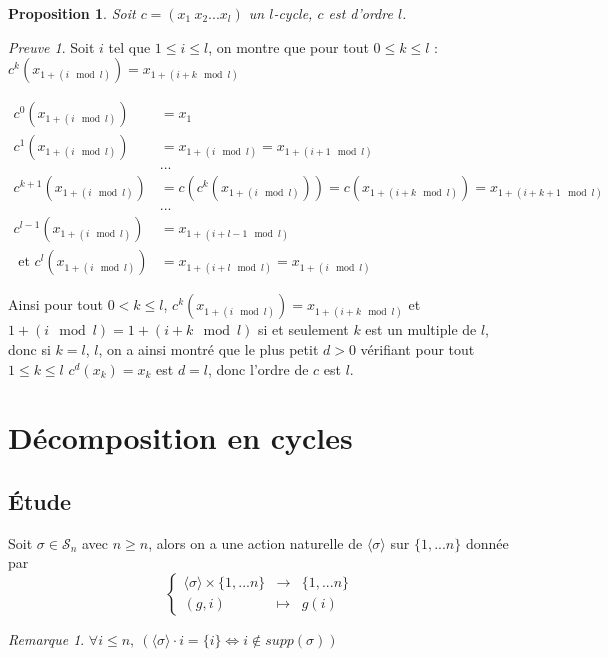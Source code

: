 \documentclass[]{article}
\newtheorem{myproposition}{Proposition}
\theoremstyle{remark}
\newtheorem{myrem}{Remarque}
\newtheorem{myproof}{Preuve}
\theoremstyle{definition}
\newcommand{\anonfunc}[4]{
\left\{ \begin{array}{lcl}
	#1 & \longrightarrow & #2 \\
	#3 & \longmapsto & #4
\end{array}
\right.
}
\begin{document}
\begin{myproposition}
	Soit $c = (x_1 ~ x_2 ... x_l)$ un $l$-cycle, $c$ est d'ordre $l$.
\end{myproposition}

\begin{myproof}
	Soit $i$ tel que $1 \leqslant i \leqslant l$, on montre que pour tout $0 \leqslant k \leqslant l$ : $c^{k}(x_{1 + (i \mod l)}) = x_{1 + (i + k \mod l)}$
	
	$$
	\begin{aligned}
		c^0(x_{1 + (i \mod l)}) &= x_1 \\
		c^1(x_{1 + (i \mod l)}) &= x_{1 + (i \mod l)} = x_{1 + (i+1 \mod l)}\\
		&...\\
		c^{k+1}(x_{1 + (i \mod l)}) &= c\left(c^k(x_{1 + (i \mod l)})\right) =c(x_{1+(i+k \mod l)}) = x_{1+(i+k+1 \mod l)}\\
		&...\\
		c^{l-1}(x_{1 + (i \mod l)}) &= x_{1 + (i + l-1 \mod l)}\\
		\text{ et } c^l(x_{1 + (i \mod l)}) &= x_{1 + (i + l \mod l)} = x_{1 + (i \mod l)}
	\end{aligned}
	$$
	
	Ainsi pour tout $0 < k \leqslant l$, $c^k(x_{1 + (i \mod l)}) = x_{1 + (i+k \mod l)}$ et $1 + (i \mod l) = 1 + (i + k \mod l)$ si et seulement $k$ est un multiple de $l$, donc si $k = l$, $l$, on a ainsi montré que le plus petit $d > 0$ vérifiant pour tout $1 \leqslant k \leqslant l$ $c^d(x_k)=x_k$ est $d = l$, donc l'ordre de $c$ est $l$.
\end{myproof}

\section{Décomposition en cycles}

\subsection{Étude}

Soit $\sigma \in \mathscr{S}_n$ avec $n \geqslant n$, alors on a une action naturelle de $\langle \sigma \rangle$ sur $\{1, ...n\}$ donnée par $$\anonfunc{\langle \sigma \rangle \times \{1, ...n\}}{\{1, ...n\}}{(g, i)}{g(i)}$$

\begin{myrem}
	$\forall i \leqslant n, ~ (\langle \sigma \rangle \cdot i = \{i\} \Longleftrightarrow i \notin supp(\sigma))$
\end{myrem}
\end{document}
